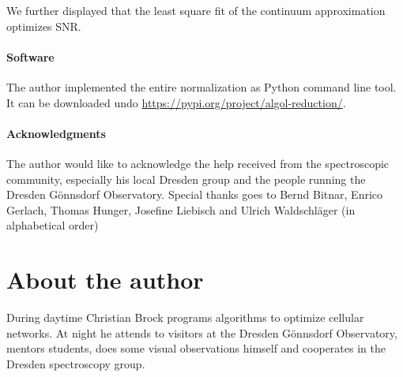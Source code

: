 \documentclass[10pt,a4paper,notitlepage,twocolumn]{article}
\begin{document}
We further displayed that the least square fit of the continuum approximation optimizes SNR.

\paragraph{Software}
The author implemented the entire normalization as Python command line tool.
It can be downloaded undo \url{https://pypi.org/project/algol-reduction/}.

\paragraph{Acknowledgments}
The author would like to acknowledge the help received from the spectroscopic community, especially his local Dresden group and the people running the Dresden Gönnsdorf Observatory. Special thanks goes to Bernd Bitnar, Enrico Gerlach, Thomas Hunger, Josefine Liebisch and Ulrich Waldschläger (in alphabetical order)




\section*{About the author}
During daytime Christian Brock programs algorithms to optimize cellular networks.
At night he attends to visitors at the Dresden Gönnsdorf Observatory, mentors students, does some visual observations himself and cooperates in the Dresden spectroscopy group.
\end{document}
